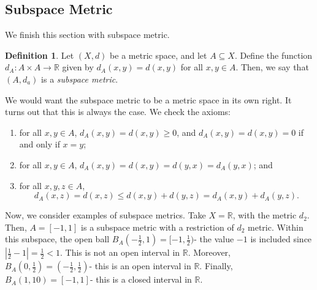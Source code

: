 \documentclass[a4paper, openany]{memoir}
\theoremstyle{definition}
\newtheorem{definition}{Definition}[section]
\theoremstyle{plain}
\begin{document}
\subsection{Subspace Metric}
We finish this section with subspace metric.
\begin{definition}
Let $(X, d)$ be a metric space, and let $A \subseteq X$. Define the function $d_A: A \times A \to \mathbb{R}$ given by $d_A(x, y) = d(x, y)$ for all $x, y \in A$. Then, we say that $(A, d_a)$ is a \emph{subspace metric}.
\end{definition}
We would want the subspace metric to be a metric space in its own right. It turns out that this is always the case. We check the axioms:
\begin{enumerate}[label=\textbf{M\arabic*}.]
    \item for all $x, y \in A$, $d_A(x, y) = d(x, y) \geqslant 0$, and $d_A(x, y) = d(x, y) = 0$ if and only if $x = y$;
    \item for all $x, y \in A$, $d_A(x, y) = d(x, y) = d(y, x) = d_A(y, x)$; and
    \item for all $x, y, z \in A$, 
    \[d_A(x, z) = d(x, z) \leqslant d(x, y) + d(y, z) = d_A(x, y) + d_A(y, z).\]
\end{enumerate}

\noindent Now, we consider examples of subspace metrics. Take $X = \mathbb{R}$, with the metric $d_2$. Then, $A = [-1, 1]$ is a subspace metric with a restriction of $d_2$ metric. Within this subspace, the open ball $B_A(-\frac{1}{2}, 1) = [-1, \frac{1}{2})$- the value $-1$ is included since $|\frac{1}{2} - 1| = \frac{1}{2} < 1$. This is not an open interval in $\mathbb{R}$. Moreover, $B_A(0, \frac{1}{2}) = (-\frac{1}{2}, \frac{1}{2})$- this is an open interval in $\mathbb{R}$. Finally, $B_A(1, 10) = [-1, 1]$- this is a closed interval in $\mathbb{R}$.
\end{document}
